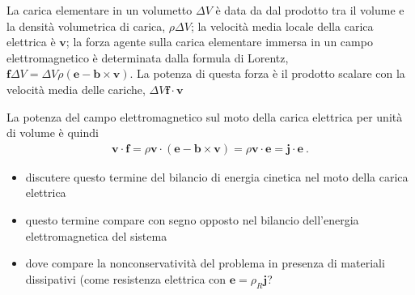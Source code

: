 \documentclass[letterpaper,10pt,english]{jupyterBook}
\begin{document}
\sphinxAtStartPar
{} 

\sphinxAtStartPar
La carica elementare in un volumetto \(\Delta V\) è data da dal prodotto tra il volume e la densità volumetrica di carica, \(\rho \Delta V\); la velocità media locale della carica elettrica è \(\mathbf{v}\); la forza agente sulla carica elementare immersa in un campo elettromagnetico è determinata dalla formula di Lorentz, \(\mathbf{f} \Delta V = \Delta V \rho \left( \mathbf{e} - \mathbf{b} \times \mathbf{v} \right)\). La potenza di questa forza è il prodotto scalare con la velocità media delle cariche, \(\Delta V \mathbf{f} \cdot \mathbf{v}\)

\sphinxAtStartPar
La potenza del campo elettromagnetico sul moto della carica elettrica per unità di volume è quindi
\begin{equation*}
\begin{split}\mathbf{v} \cdot \mathbf{f} = \rho \mathbf{v} \cdot \left( \mathbf{e} - \mathbf{b} \times \mathbf{v} \right) = \rho \mathbf{v} \cdot \mathbf{e} = \mathbf{j} \cdot \mathbf{e} \ .\end{split}
\end{equation*}
\sphinxAtStartPar
{}
\begin{itemize}
\item {} 
\sphinxAtStartPar
discutere questo termine del bilancio di energia cinetica nel moto della carica elettrica

\item {} 
\sphinxAtStartPar
questo termine compare con segno opposto nel bilancio dell’energia elettromagnetica del sistema

\item {} 
\sphinxAtStartPar
dove compare la non\sphinxhyphen{}conservatività del problema in presenza di materiali dissipativi (come resistenza elettrica con \(\mathbf{e} = \rho_R \mathbf{j}\)?

\end{itemize}
\end{document}
